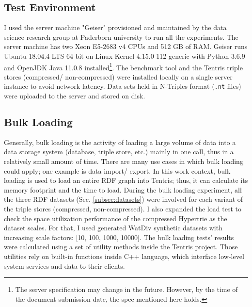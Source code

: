 \subsection{Test Environment} I used the server machine "Geiser" provisioned and maintained by the data science research group at Paderborn university to run all the experiments. 
The server machine has two Xeon E5-2683 v4 CPUs and 512 GB of RAM. 
Geiser runs Ubuntu 18.04.4 LTS 64-bit on Linux Kernel 4.15.0-112-generic with Python 3.6.9 and OpenJDK Java 11.0.8 installed\footnote{The server specification may change in the future. However, by the time of the document submission date, the spec mentioned here holds.}.
The benchmark tool and the Tentris triple stores (compressed/ non-compressed) were installed locally on a single server instance to avoid network latency. 
Data sets held in N-Triples format (\verb|.nt| files) were uploaded to the server and stored on disk.

\subsection{Bulk Loading} 
Generally, bulk loading is the activity of loading a large volume of data into a data storage system (database, triple store, etc.) mainly in one call, thus in a relatively small amount of time. 
There are many use cases in which bulk loading could apply; one example is data import/ export.
In this work context, bulk loading is used to load an entire RDF graph into Tentris; thus, it can calculate its memory footprint and the time to load.
During the bulk loading experiment, all the three RDF datasets (Sec. \ref{subsec:datasets}) were involved for each variant of the triple stores (compressed, non-compressed).
I also expanded the load test to check the space utilization performance of the compressed Hypertrie as the dataset scales.
For that, I used generated WatDiv synthetic datasets with increasing scale factors: [10, 100, 1000, 10000]. 
The bulk loading tests' results were calculated using a set of utility methods inside the Tentris project. Those utilities rely on built-in functions inside C++ language, which interface low-level system services and data to their clients.

